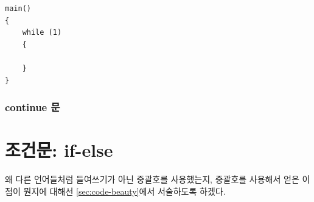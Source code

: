 \documentclass[a4paper,12pt]{book}
\begin{document}
\begin{lstlisting}
main()
{
    while (1)
    {
        
    }
}
\end{lstlisting}


\subsubsection{continue 문}


\section{조건문: if-else}

왜 다른 언어들처럼 들여쓰기가 아닌 중괄호를 사용했는지,
중괄호를 사용해서 얻은 이점이 뭔지에 대해선
\autoref{sec:code-beauty}에서 서술하도록 하겠다.

\end{document}
